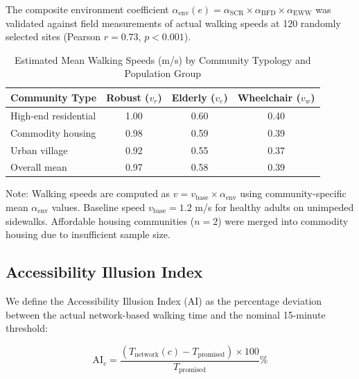 \documentclass[10pt,conference,compsoc]{IEEEtran}
\begin{document}
The composite environment coefficient $\alpha_{\text{env}}(e) = \alpha_{\text{SCR}} \times \alpha_{\text{BFD}} \times \alpha_{\text{EWW}}$ was validated against field measurements of actual walking speeds at 120 randomly selected sites (Pearson $r = 0.73$, $p < 0.001$).

\begin{table}[htbp]
\caption{Estimated Mean Walking Speeds (m/s) by Community Typology and Population Group}
\label{tab:velocity_model}
\begin{center}
\begin{threeparttable}
\begin{tabular}{lccc}
\toprule
Community Type & Robust ($v_r$) & Elderly ($v_e$) & Wheelchair ($v_w$) \\
\midrule
High-end residential & 1.00 & 0.60 & 0.40 \\
Commodity housing & 0.98 & 0.59 & 0.39 \\
Urban village & 0.92 & 0.55 & 0.37 \\
\midrule
Overall mean & 0.97 & 0.58 & 0.39 \\
\bottomrule
\end{tabular}
\begin{tablenotes}
\item Note: Walking speeds are computed as $v = v_{\text{base}} \times \alpha_{\text{env}}$ using community-specific mean $\alpha_{\text{env}}$ values. Baseline speed $v_{\text{base}} = 1.2$ m/s for healthy adults on unimpeded sidewalks. Affordable housing communities ($n=2$) were merged into commodity housing due to insufficient sample size.
\end{tablenotes}
\end{threeparttable}
\end{center}
\end{table}

\subsection{Accessibility Illusion Index}

We define the Accessibility Illusion Index (AI) as the percentage deviation between the actual network-based walking time and the nominal 15-minute threshold:

\begin{equation}
\text{AI}_c = \frac{(T_{\text{network}}(c) - T_{\text{promised}}) \times 100}{T_{\text{promised}}}\%
\label{eq:ai_index}
\end{equation}
\end{document}
